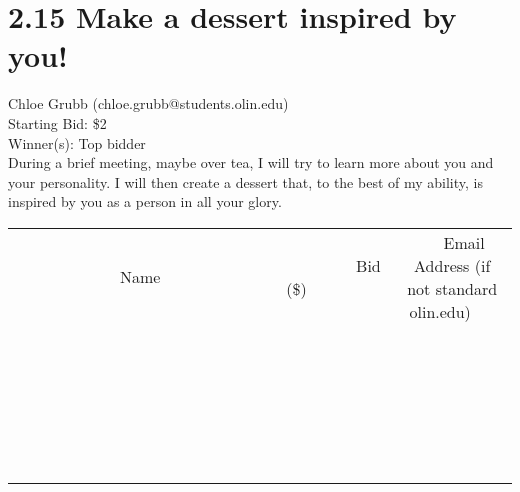 \documentclass[11pt]{article}
\begin{document}
\section*{2.15 Make a dessert inspired by you!}
Chloe Grubb (chloe.grubb@students.olin.edu) \\
Starting Bid: \$2 \\
Winner(s): 
Top bidder \\
During a brief meeting, maybe over tea, I will try to learn more about you and your personality. I will then create a dessert that, to the best of my ability, is inspired by you as a person in all your glory. \\[6ex]
\begin{tabular}{c c c}
~~~~~~~~~~~~~Name~~~~~~~~~~~~~ & ~~~~~~~~~Bid (\$)~~~~~~~~~ & ~~~Email Address (if not standard olin.edu)~~~ \\
 & & \\
\hline
 & & \\
\hline
 & & \\
\hline
 & & \\
\hline
 & & \\
\hline
 & & \\
\hline
 & & \\
\hline
 & & \\
\hline
 & & \\
\hline
 & & \\
\hline
 & & \\
\hline
 & & \\
\hline
 & & \\
\hline
 & & \\
\hline
 & & \\
\hline
 & & \\
\hline
 & & \\
\hline
 & & \\
\hline
 & & \\
\hline
 & & \\
\hline
 & & \\
\hline
 & & \\
\hline
 & & \\
\hline
 & & \\
\hline
 & & \\
\hline
 & & \\
\hline
\end{tabular}
\clearpage
\end{document}
